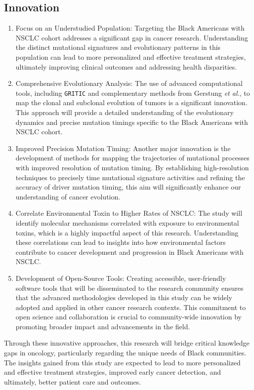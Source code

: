 \subsection*{Innovation}

\begin{enumerate}

\item{Focus on an Understudied Population: 
Targeting the Black Americans with NSCLC cohort addresses a significant gap in cancer research. 
Understanding the distinct mutational signatures and evolutionary patterns in this population 
can lead to more personalized and effective treatment strategies, 
ultimately improving clinical outcomes and addressing health disparities.}
\item Comprehensive Evolutionary Analysis: 
The use of advanced computational tools, including \texttt{GRITIC} and complementary methods from Gerstung \textit{et al.}, 
to map the clonal and subclonal evolution of tumors is a significant innovation. 
This approach will provide a detailed understanding of the evolutionary dynamics and 
precise mutation timings specific to the Black Americans with NSCLC cohort.
\item Improved Precision Mutation Timing: 
Another major innovation is the development of methods for mapping the trajectories of mutational processes with improved resolution of mutation timing. 
By establishing high-resolution techniques to precisely time mutational signature activities and refining the accuracy of driver mutation timing, 
this aim will significantly enhance our understanding of cancer evolution.
\item Correlate Environmental Toxin to Higher Rates of NSCLC: 
The study will identify molecular mechanisms correlated with exposure to environmental toxins, which is a highly impactful aspect of this research. 
Understanding these correlations can lead to insights into how environmental factors contribute to cancer development and progression in Black Americans with NSCLC.
\item Development of Open-Source Tools: 
Creating accessible, user-friendly software tools that will be disseminated to the research community 
ensures that the advanced methodologies developed in this study can be widely adopted and applied in other cancer research contexts. 
This commitment to open science and collaboration is crucial to community-wide innovation by promoting broader impact and advancements in the field.

\end{enumerate}

\vspace{1em}
\noindent
Through these innovative approaches, this research will bridge critical knowledge gaps 
in oncology, particularly regarding the unique needs of Black communities. 
The insights gained from this study are expected to lead to more personalized and 
effective treatment strategies, improved early cancer detection, and ultimately, better patient care and outcomes.
